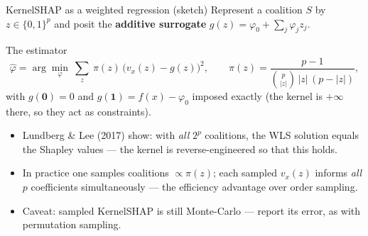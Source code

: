 \documentclass[aspectratio=169,11pt]{beamer}
\begin{document}
\begin{frame}{KernelSHAP as a weighted regression (sketch)}
  \footnotesize
  Represent a coalition $S$ by $z\in\{0,1\}^p$ and posit the \textbf{additive
  surrogate} $g(z)=\varphi_0+\sum_j \varphi_j z_j$.
  \begin{block}{The estimator}
    \[
      \hat\varphi = \arg\min_{\varphi}\ \sum_{z}\ \pi(z)\,
      \bigl(v_x(z) - g(z)\bigr)^2,
      \qquad
      \pi(z)=\frac{p-1}{\binom{p}{|z|}\,|z|\,(p-|z|)},
    \]
    with $g(\mathbf{0})=0$ and $g(\mathbf{1})=f(x)-\varphi_0$ imposed exactly
    (the kernel is $+\infty$ there, so they act as constraints).
  \end{block}
  \begin{readme}
    \begin{itemize}
      \item Lundberg \& Lee (2017) show: with \emph{all} $2^p$ coalitions, the WLS
            solution equals the Shapley values --- the kernel is reverse-engineered
            so that this holds.
      \item In practice one samples coalitions $\propto\pi(z)$; each sampled $v_x(z)$
            informs \emph{all} $p$ coefficients simultaneously --- the efficiency
            advantage over order sampling.
      \item Caveat: sampled KernelSHAP is still Monte-Carlo --- report its error, as
            with permutation sampling.
    \end{itemize}
  \end{readme}
\end{frame}
\end{document}
